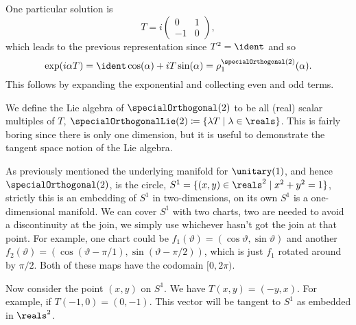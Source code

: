 One particular solution is
\begin{equation}
    T = i
    \begin{pmatrix}
        0 & 1\\
        -1 & 0
    \end{pmatrix}
    ,
\end{equation}
which leads to the previous representation since \(T^2 = \ident\) and so
\begin{equation}
    \exp(i\alpha T) = \ident \cos(\alpha) + iT\sin(\alpha) = \rho_1^{\specialOrthogonal(2)}(\alpha).
\end{equation}
This follows by expanding the exponential and collecting even and odd terms.

We define the Lie algebra of \(\specialOrthogonal(2)\) to be all (real) scalar multiples of \(T\), \(\specialOrthogonalLie(2) \coloneqq \{\lambda T \mid \lambda \in \reals\}\).
This is fairly boring since there is only one dimension, but it is useful to demonstrate the tangent space notion of the Lie algebra.

As previously mentioned the underlying manifold for \(\unitary(1)\), and hence \(\specialOrthogonal(2)\), is the circle, \(S^1 = \{(x, y) \in \reals^2 \mid x^2 + y^2 = 1\}\), strictly this is an embedding of \(S^1\) in two-dimensions, on its own \(S^1\) is a one-dimensional manifold.
We can cover \(S^1\) with two charts, two are needed to avoid a discontinuity at the join, we simply use whichever hasn't got the join at that point.
For example, one chart could be \(f_1(\vartheta) = (\cos\vartheta, \sin\vartheta)\) and another \(f_2(\vartheta) = (\cos(\vartheta - \pi/1), \sin(\vartheta - \pi/2))\), which is just \(f_1\) rotated around by \(\pi/2\).
Both of these maps have the codomain \([0, 2\pi)\).

Now consider the point \((x, y)\) on \(S^1\).
We have \(T(x, y) = (-y, x)\).
For example, if \(T(-1, 0) = (0, -1)\).
This vector will be tangent to \(S^1\) as embedded in \(\reals^2\).

